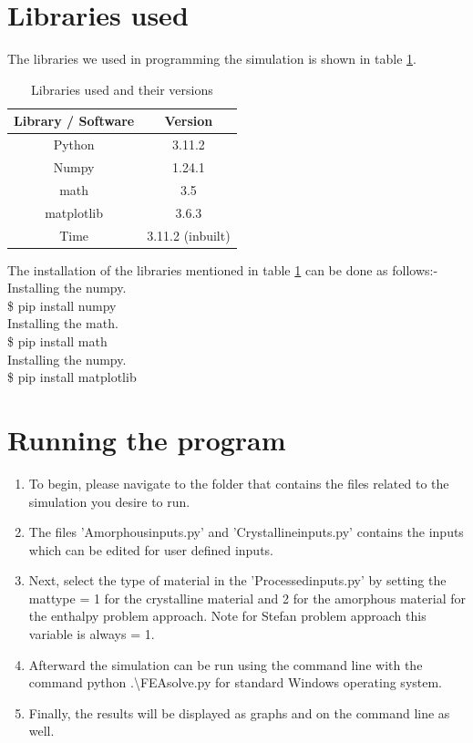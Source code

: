 \section{Libraries used}
The libraries we used in programming the simulation is shown in table \ref{tab:softwares used}. \\
\begin{table}[h]
    \centering
    \begin{tabular}{|c|c|} \hline 
         \textbf{Library / Software}& \textbf{Version}\\ \hline 
 Python &3.11.2\\ \hline 
         Numpy& 1.24.1\\ \hline 
         math& 3.5\\ \hline 
         matplotlib& 3.6.3\\ \hline
 Time&3.11.2 (inbuilt)\\\hline
    \end{tabular}
    \caption{Libraries used and their versions}
    \label{tab:softwares used}
\end{table}
\noindent The installation of the libraries mentioned in table \ref{tab:softwares used} can be done as follows:-\\
Installing the numpy.\\
\indent \indent \$ pip install numpy\\
Installing the math.\\
\indent \indent \$ pip install math\\
Installing the numpy.\\
\indent \indent \$ pip install matplotlib\\
\section{Running the program}
\begin{enumerate}
    \item To begin, please navigate to the folder that contains the files related to the simulation you desire to run.
    \item   The files 'Amorphous\textunderscore inputs.py' and 'Crystalline\textunderscore inputs.py' contains the inputs which can be edited for user defined inputs.
    \item Next, select the type of material in the 'Processed\textunderscore inputs.py' by setting the mat\textunderscore type = 1 for the crystalline material and 2 for the amorphous material for the enthalpy problem approach. Note for Stefan problem approach this variable is always = 1.
    \item    Afterward the simulation can be run using the command line with the command python .\textbackslash FEA\textunderscore solve.py for standard Windows operating system.
    \item Finally, the results will be displayed as graphs and on the command line as well.
\end{enumerate}
\newpage
